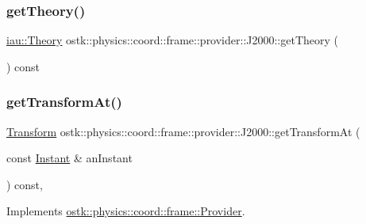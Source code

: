 \mbox{\label{classostk_1_1physics_1_1coord_1_1frame_1_1provider_1_1_j2000_aaa4b6174cab5b7a52a4bee763be5b033}} 
\subsubsection{\texorpdfstring{get\+Theory()}{getTheory()}}
{\footnotesize\ttfamily \hyperlink{namespaceostk_1_1physics_1_1coord_1_1frame_1_1providers_1_1iau_ae5e299153ae66dd034c8427dabfaff05}{iau\+::\+Theory} ostk\+::physics\+::coord\+::frame\+::provider\+::\+J2000\+::get\+Theory (\begin{DoxyParamCaption}{ }\end{DoxyParamCaption}) const}

\mbox{\label{classostk_1_1physics_1_1coord_1_1frame_1_1provider_1_1_j2000_a8e67390cf0c828e41d33ec2960d7578f}} 
\subsubsection{\texorpdfstring{get\+Transform\+At()}{getTransformAt()}}
{\footnotesize\ttfamily \hyperlink{classostk_1_1physics_1_1coord_1_1_transform}{Transform} ostk\+::physics\+::coord\+::frame\+::provider\+::\+J2000\+::get\+Transform\+At (\begin{DoxyParamCaption}\item[{const \hyperlink{classostk_1_1physics_1_1time_1_1_instant}{Instant} \&}]{an\+Instant }\end{DoxyParamCaption}) const\hspace{0.3cm}{\ttfamily [override]}, {\ttfamily [virtual]}}



Implements \hyperlink{classostk_1_1physics_1_1coord_1_1frame_1_1_provider_a38b86a589f46f8b8a9c97ab2776f37d1}{ostk\+::physics\+::coord\+::frame\+::\+Provider}.

